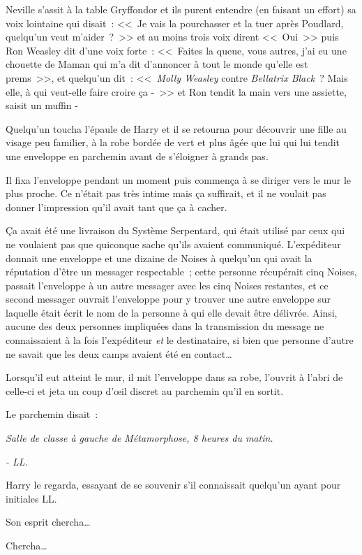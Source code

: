 Neville s'assit à la table Gryffondor et ils purent entendre (en faisant un effort) sa voix lointaine qui disait~: <<~Je vais la pourchasser et la tuer après Poudlard, quelqu'un veut m'aider~?~>> et au moins trois voix dirent <<~Oui~>> puis Ron Weasley dit d'une voix forte~: <<~Faites la queue, vous autres, j'ai eu une chouette de Maman qui m'a dit d'annoncer à tout le monde qu'elle est prems~>>, et quelqu'un dit~: <<~\emph{Molly Weasley} contre \emph{Bellatrix Black}~? Mais elle, à qui veut-elle faire croire ça -~>> et Ron tendit la main vers une assiette, saisit un muffin -

Quelqu'un toucha l'épaule de Harry et il se retourna pour découvrir une fille au visage peu familier, à la robe bordée de vert et plus âgée que lui qui lui tendit une enveloppe en parchemin avant de s'éloigner à grands pas.

Il fixa l'enveloppe pendant un moment puis commença à se diriger vers le mur le plus proche. Ce n'était pas très intime mais ça suffirait, et il ne voulait pas donner l'impression qu'il avait tant que ça à cacher.

Ça avait été une livraison du Système Serpentard, qui était utilisé par ceux qui ne voulaient pas que quiconque sache qu'ils avaient communiqué. L'expéditeur donnait une enveloppe et une dizaine de Noises à quelqu'un qui avait la réputation d'être un messager respectable~; cette personne récupérait cinq Noises, passait l'enveloppe à un autre messager avec les cinq Noises restantes, et ce second messager ouvrait l'enveloppe pour y trouver une autre enveloppe sur laquelle était écrit le nom de la personne à qui elle devait être délivrée. Ainsi, aucune des deux personnes impliquées dans la transmission du message ne connaissaient à la fois l'expéditeur \emph{et} le destinataire, si bien que personne d'autre ne savait que les deux camps avaient été en contact…

Lorsqu'il eut atteint le mur, il mit l'enveloppe dans sa robe, l'ouvrit à l'abri de celle-ci et jeta un coup d'œil discret au parchemin qu'il en sortit.

Le parchemin disait~:

\emph{Salle de classe à gauche de Métamorphose, 8 heures du matin.}

\emph{- LL.}

Harry le regarda, essayant de se souvenir s'il connaissait quelqu'un ayant pour initiales LL.

Son esprit chercha…

Chercha…

